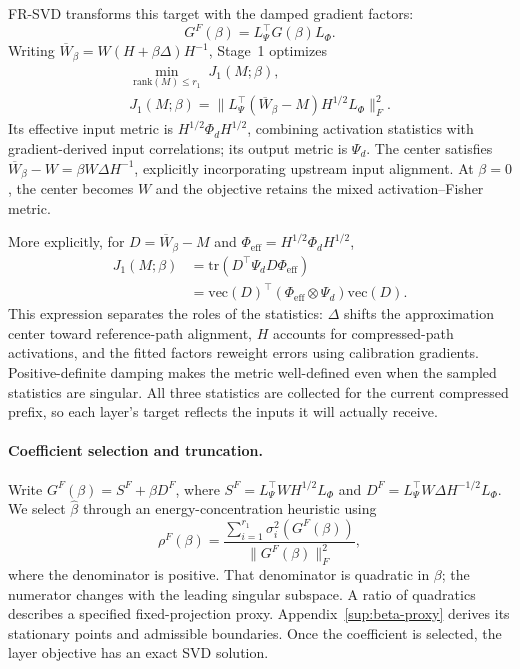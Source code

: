 \documentclass[11pt]{article}
\begin{document}
FR-SVD transforms this target with the damped gradient factors:
\begin{equation}
G^F(\beta)=L_\Psi^\top G(\beta)L_\Phi.
\label{eq:fisher-target}
\end{equation}
Writing $\overline W_\beta=W(H+\beta\Delta)H^{-1}$, Stage~1 optimizes
\begin{equation}
\begin{aligned}
\min_{\mathrm{rank}(M)\le r_1}\;J_1(M;\beta),\\
J_1(M;\beta)=\|L_\Psi^\top(\overline W_\beta-M)
H^{1/2}L_\Phi\|_F^2.
\end{aligned}
\label{eq:stage1-objective}
\end{equation}
Its effective input metric is $H^{1/2}\Phi_dH^{1/2}$, combining activation statistics with gradient-derived input correlations; its output metric is $\Psi_d$. The center satisfies $\overline W_\beta-W=\beta W\Delta H^{-1}$, explicitly incorporating upstream input alignment. At $\beta=0$, the center becomes $W$ and the objective retains the mixed activation--Fisher metric.

More explicitly, for $D=\overline W_\beta-M$ and $\Phi_{\mathrm{eff}}=H^{1/2}\Phi_dH^{1/2}$,
\begin{equation}
\begin{aligned}
J_1(M;\beta)
&=\mathrm{tr}(D^\top\Psi_dD\Phi_{\mathrm{eff}})\\
&=\mathrm{vec}(D)^\top
(\Phi_{\mathrm{eff}}\otimes\Psi_d)\mathrm{vec}(D).
\end{aligned}
\label{eq:stage1-metric}
\end{equation}
This expression separates the roles of the statistics: $\Delta$ shifts the approximation center toward reference-path alignment, $H$ accounts for compressed-path activations, and the fitted factors reweight errors using calibration gradients. Positive-definite damping makes the metric well-defined even when the sampled statistics are singular. All three statistics are collected for the current compressed prefix, so each layer's target reflects the inputs it will actually receive.

\paragraph{Coefficient selection and truncation.}
Write $G^F(\beta)=S^F+\beta D^F$, where $S^F=L_\Psi^\top WH^{1/2}L_\Phi$ and $D^F=L_\Psi^\top W\Delta H^{-1/2}L_\Phi$. We select $\widehat\beta$ through an energy-concentration heuristic using
\begin{equation}
\rho^F(\beta)=
\frac{\sum_{i=1}^{r_1}\sigma_i^2(G^F(\beta))}
{\|G^F(\beta)\|_F^2},
\label{eq:fisher-rer}
\end{equation}
where the denominator is positive. That denominator is quadratic in $\beta$; the numerator changes with the leading singular subspace. A ratio of quadratics describes a specified fixed-projection proxy. Appendix~\ref{sup:beta-proxy} derives its stationary points and admissible boundaries. Once the coefficient is selected, the layer objective has an exact SVD solution.
\end{document}
